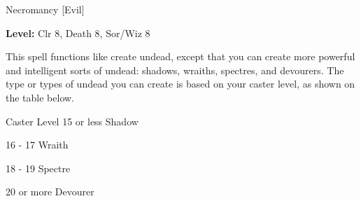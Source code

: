 
Necromancy [Evil]

\textbf{Level:} Clr 8, Death 8, Sor/Wiz 8

This spell functions like create undead, except that you can create more powerful 
and intelligent sorts of undead: shadows, wraiths, spectres, and devourers. The 
type or types of undead you can create is based on your caster level, as shown 
on the table below.

\begin{description*}
\item[Caster Level 15 or less] Shadow
\item[16 - 17] Wraith
\item[18 - 19] Spectre
\item[20 or more] Devourer
\end{description*}
